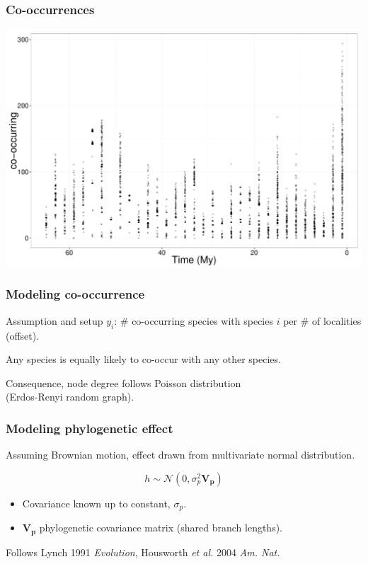 \documentclass{beamer}
\begin{document}
\begin{frame}
  \frametitle{Co-occurrences}
  \begin{center}
    \includegraphics[height = 0.8\textheight, width = \textwidth,  keepaspectratio = true]{figure/count}
  \end{center}
\end{frame}

\begin{frame}
  \frametitle{Modeling co-occurrence}
  \begin{alertblock}{Assumption and setup}
    \(y_{i}\): \# co-occurring species with species \(i\) per \# of localities (offset).

    Any species is equally likely to co-occur with any other species.

    Consequence, node degree follows Poisson distribution \\(Erdos-Renyi random graph).
  \end{alertblock}
\end{frame}

\begin{frame}
  \frametitle{Modeling phylogenetic effect}
  \begin{definition}
    Assuming Brownian motion, effect drawn from multivariate normal distribution.

    \begin{equation*}
      h \sim \mathcal{N}(0, \sigma_{p}^{2}\mathbf{V_{p}})
    \end{equation*}

    \begin{itemize}
      \item Covariance known up to constant, \(\sigma_{p}\).
      \item \(\mathbf{V_{p}}\) phylogenetic covariance matrix (shared branch lengths).
    \end{itemize}

    \tiny{Follows Lynch 1991 \textit{Evolution}, Housworth \textit{et al.} 2004 \textit{Am. Nat.}}
  \end{definition}
\end{frame}
\end{document}
